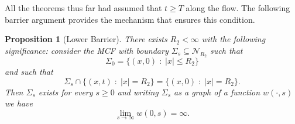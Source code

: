 \documentclass[leqno,11pt]{amsart}
\newtheorem{proposition}[theorem]{Proposition}
\theoremstyle{definition}
\begin{document}
All the theorems thus far had assumed that $t\geq T$ along the flow. The following barrier argument provides the mechanism that ensures this condition.
\begin{proposition}[Lower Barrier]\label{barrier_proposition}
There exists $R_2<\infty$ with the following significance: consider the MCF with boundary $\Sigma_s \subseteq \mathcal{N}_{R_2}$ such that  
\[
\Sigma_0=\{(x,0)\;:\; |x|\leq R_2\}
\] 
and such that 
\[
\Sigma_s\cap \{(x,t)\;:\; |x|= R_2\}= \{(x,0)\;:\; |x|=R_2\}.
\]
Then $\Sigma_s$ exists for every $s\geq 0$ and writing $\Sigma_s$ as a graph of a function $w(\cdot,s)$ we have   
\begin{equation}
\lim_{s\rightarrow \infty} w(0,s)=\infty.
\end{equation} 
\end{proposition}
\end{document}

